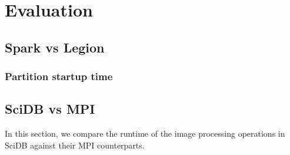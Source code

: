 \documentclass[tog]{acmsiggraph}
\begin{document}
\section{Evaluation}

\subsection{Spark vs Legion}

\subsubsection{Partition startup time}

\subsection{SciDB vs MPI}\label{sec:clusterexp}
In this section, we compare the runtime of the image processing operations in SciDB against their MPI counterparts. 
\end{document}
